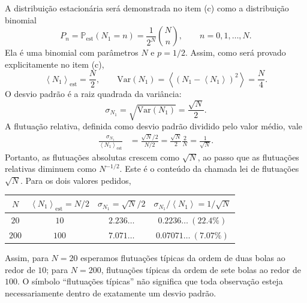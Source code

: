 \documentclass[12pt,a4paper]{article}
\newcommand{\Prob}{\mathbb{P}}
\newcommand{\avg}[1]{\left\langle #1\right\rangle}
\newcommand{\Var}{\mathrm{Var}}
\begin{document}
A distribuição estacionária será demonstrada no item (c) como a distribuição binomial
%
\begin{equation}
  P_n=\Prob_{\mathrm{est}}(N_1=n)=\frac{1}{2^N}\binom{N}{n},\qquad n=0,1,\ldots,N.
  \label{eq:binomial}
\end{equation}
%
Ela é uma binomial com parâmetros $N$ e $p=1/2$. Assim, como será provado explicitamente no item (c),
%
\begin{equation}
  \avg{N_1}_{\mathrm{est}}=\frac{N}{2},\qquad
  \Var(N_1)=\avg{(N_1-\avg{N_1})^2}=\frac{N}{4}.
  \label{eq:meanvar_preview}
\end{equation}
%
O desvio padrão é a raiz quadrada da variância:
%
\begin{equation}
  \boxed{\sigma_{N_1}=\sqrt{\Var(N_1)}=\frac{\sqrt{N}}{2}.}
  \label{eq:sigma}
\end{equation}
%
A flutuação relativa, definida como desvio padrão dividido pelo valor médio, vale
%
\begin{align}
  \frac{\sigma_{N_1}}{\avg{N_1}_{\mathrm{est}}}
  &=\frac{\sqrt{N}/2}{N/2}
   =\frac{\sqrt{N}}{2}\frac{2}{N}
   =\boxed{\frac{1}{\sqrt{N}}}.
  \label{eq:relativefluct}
\end{align}
%
Portanto, as flutuações absolutas crescem como $\sqrt{N}$, ao passo que as flutuações relativas diminuem como $N^{-1/2}$. Este é o conteúdo da chamada lei de flutuações $\sqrt{N}$. Para os dois valores pedidos,
%
\begin{center}
\begin{tabular}{@{}cccc@{}}
\toprule
$N$ & $\avg{N_1}_{\mathrm{est}}=N/2$ & $\sigma_{N_1}=\sqrt{N}/2$ & $\sigma_{N_1}/\avg{N_1}=1/\sqrt{N}$\\
\midrule
$20$  & $10$  & $2.236\ldots$ & $0.2236\ldots\ (22.4\%)$\\
$200$ & $100$ & $7.071\ldots$ & $0.07071\ldots\ (7.07\%)$\\
\bottomrule
\end{tabular}
\end{center}
%
Assim, para $N=20$ esperamos flutuações típicas da ordem de duas bolas ao redor de $10$; para $N=200$, flutuações típicas da ordem de sete bolas ao redor de $100$. O símbolo ``flutuações típicas'' não significa que toda observação esteja necessariamente dentro de exatamente um desvio padrão.
\end{document}
